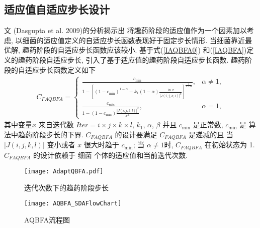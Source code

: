 \subsection{适应值自适应步长设计}
文 (Dasgupta et al. 2009)的分析揭示出 将趣药阶段的适应值作为一个因素加以考虑, 以细菌的适应值定义的自适应步长函数表现好于固定步长情形.
当细菌靠近最优解, 趣药阶段的自适应步长函数应该较小. 基于式(\ref{IAQBFA0}) 和(\ref{IAQBFA})定义的趣药阶段自适应步长, 引入了基于适应值的趣药阶段自适应步长函数.
趣药阶段的自适应步长函数定义如下
\begin{align}\label{FAQBFA}
C_{FAQBFA}
 =
\left\{
  \begin{array}{ll}
  \frac{c_{\min}}{1-\left[(1-c_{\min})^{1-\alpha}-k_1(1-\alpha)\frac{\ln x}{|J(i,j,k,l)|^{\beta}}\right]^{\frac{1}{1-\alpha}}},&  \alpha\neq 1,\\
  \frac{c_{\min}}{1-(1-c_{\min})\frac{|J(i,j,k,l)|^{\beta}}{x^{k_1}}},&  \alpha= 1,
  \end{array}
  \right.
\end{align}
其中变量$x$ 来自迭代数 $Iter=i\times j\times k \times l$, $k_1$, $\alpha$, $\beta$ 并且 $c_{\min}$ 是正常数, $c_{\min}$ 是 算法中趋药阶段步长的下界.
$C_{FAQBFA}$ 的设计要满足 $C_{FAQBFA}$ 是递减的且 当 $|J(i,j,k,l)|$ 变小或者 $x$ 很大时趋于 $c_{\min}$;
当 $\alpha\neq 1$时, $C_{FAQBFA}$ 在初始状态为 1. $C_{FAQBFA}$ 的设计依赖于 细菌 个体的适应值和当前迭代次数.
\begin{figure}[!tbp]
\begin{center}
    \texttt{[image: AdaptQBFA.pdf]}
    \caption{迭代次数下的趋药阶段步长}
    \label{AdaptQBFA:fig1}
    \vspace{-0.5em}
\end{center}
\end{figure}
\begin{figure*}[tb]
    \begin{center}
     \texttt{[image: AQBFA\_SDAFlowChart]}
      \caption{AQBFA流程图}
      \label{fig:FlowchartAQBFA}
      \vspace{-0.4cm}
    \end{center}
\end{figure*}
